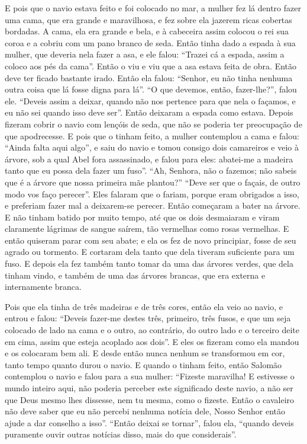 E pois que o navio estava feito e foi colocado no mar, a mulher fez lá dentro
fazer uma cama, que era grande e maravilhosa, e fez sobre ela jazerem ricas
cobertas bordadas. A cama, ela era grande e bela, e à cabeceira assim colocou o
rei sua coroa e a cobriu com um pano branco de seda. Então tinha dado a espada
à sua mulher, que deveria nela fazer a asa, e ele falou: “Trazei cá a espada,
assim a coloco aos pés da cama”. Então o viu e viu que a asa estava feita de
obra. Então deve ter ficado bastante irado. Então ela falou: “Senhor, eu não
tinha nenhuma outra coisa que lá fosse digna para lá”. “O que devemos, então,
fazer-lhe?”, falou ele. “Deveis assim a deixar, quando não nos pertence para
que nela o façamos, e eu não sei quando isso deve ser”. Então deixaram a espada
como estava. Depois fizeram cobrir o navio com lençóis de seda, que não se
poderia ter preocupação de que apodrecesse. E pois que o tinham feito, a mulher
contemplou a cama e falou: “Ainda falta aqui algo”, e saiu do navio e tomou
consigo dois camareiros e veio à árvore, sob a qual Abel fora assassinado, e
falou para eles: abatei-me a madeira tanto que eu possa dela fazer um fuso”.
“Ah, Senhora, não o fazemos; não sabeis que é a árvore que nossa primeira mãe
plantou?” “Deve ser que o façais, de outro modo vos faço perecer”. Eles
falaram que o fariam, porque eram obrigados a isso, e preferiam fazer mal a
deixarem-se perecer. Então começaram a bater na árvore. E não tinham batido por
muito tempo, até que os dois desmaiaram e viram claramente lágrimas de sangue
saírem, tão vermelhas como rosas vermelhas. E então quiseram parar com seu
abate; e ela os fez de novo principiar, fosse de seu agrado ou tormento. E
cortaram dela tanto que dela tiveram suficiente para um fuso. E depois ela fez
também tanto tomar da uma das árvores verdes, que dela tinham vindo, e também
de uma das árvores brancas, que era externa e internamente branca.

Pois que ela tinha de três madeiras e de três cores, então ela veio ao navio, e
entrou e falou: “Deveis fazer-me destes três, primeiro, três fusos, e que um
seja colocado de lado na cama e o outro, ao contrário, do outro lado e o
terceiro deite em cima, assim que esteja acoplado aos dois”. E eles os fizeram
como ela mandou e os colocaram bem ali. E desde então nunca nenhum se
transformou em cor, tanto tempo quanto durou o navio. E quando o tinham feito,
então Salomão contemplou o navio e falou para a sua mulher: “Fizeste maravilha!
E estivesse o mundo inteiro aqui, não poderia perceber este significado deste
navio, a não ser que Deus mesmo lhes dissesse, nem tu mesma, como o fizeste.
Então o cavaleiro não deve saber que eu não percebi nenhuma notícia dele, Nosso
Senhor então ajude a dar conselho a isso”. “Então deixai se tornar”, falou ela,
“quando deveis puramente ouvir outras notícias disso, mais do que considerais”.


